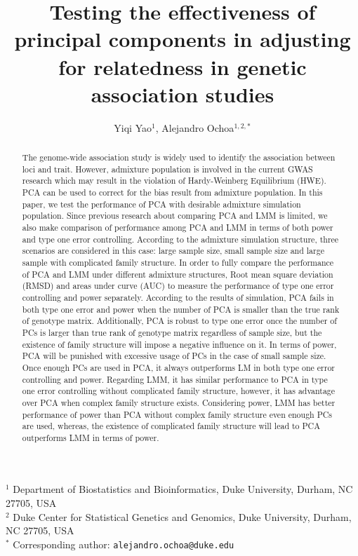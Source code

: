 \documentclass[11pt]{article}
\title{\Large \textbf{Testing the effectiveness of principal components in adjusting for relatedness in genetic association studies}}
\author{Yiqi Yao$^1$, Alejandro Ochoa$^{1,2,*}$}
\date{}
\begin{document}
\maketitle

\noindent
$^1$ Department of Biostatistics and Bioinformatics, Duke University, Durham, NC 27705, USA \\
$^2$ Duke Center for Statistical Genetics and Genomics, Duke University, Durham, NC 27705, USA \\
$^*$ Corresponding author: \texttt{alejandro.ochoa@duke.edu}


\begin{abstract}
  The genome-wide association study is widely used to identify the association between loci and trait.
  However, admixture population is involved in the current GWAS research which may result in the violation of Hardy-Weinberg Equilibrium (HWE).
  PCA can be used to correct for the bias result from admixture population.
  In this paper, we test the performance of PCA with desirable admixture simulation population.
  Since previous research about comparing PCA and LMM is limited, we also make comparison of performance among PCA and LMM in terms of both power and type one error controlling.
  According to the admixture simulation structure, three scenarios are considered in this case: large sample size, small sample size and large sample with complicated family structure.
  In order to fully compare the performance of PCA and LMM under different admixture structures, Root mean square deviation (RMSD) and areas under curve (AUC) to measure the performance of type one error controlling and power separately.
  According to the results of simulation, PCA fails in both type one error and power when the number of PCA is smaller than the true rank of genotype matrix.
  Additionally, PCA is robust to type one error once the number of PCs is larger than true rank of genotype matrix regardless of sample size, but the existence of family structure will impose a negative influence on it.
  In terms of power, PCA will be punished with excessive usage of PCs in the case of small sample size.
  Once enough PCs are used in PCA, it always outperforms LM in both type one error controlling and power.
  Regarding LMM, it has similar performance to PCA in type one error controlling without complicated family structure, however, it has advantage over PCA when complex family structure exists.
  Considering power, LMM has better performance of power than PCA without complex family structure even enough PCs are used, whereas, the existence of complicated family structure will lead to PCA outperforms LMM in terms of power. 
\end{abstract}
\end{document}
